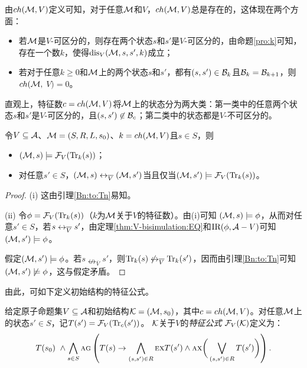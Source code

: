 由$ch({\cal M},V)$定义可知，对于任意${\cal M}$和$V$，$ch({\cal M},V)$总是存在的，这体现在两个方面：
\begin{itemize}
	\item[(1)] 若${\cal M}$是$V$-可区分的，则存在两个状态$s$和$s'$是$V$-可区分的，由命题\ref{pro:k}可知，存在一个数$k$，使得$\textrm{dis}_V({\cal M},s,s',k)$成立；
	\item[(2)] 若对于任意$k\geq 0$和${\cal M}$上的两个状态$s$和$s'$，都有$(s,s')\in {\cal B}_k$且${\cal B}_k ={\cal B}_{k+1}$，则$ch({\cal M},$ $V)=0$。
\end{itemize}

直观上，特征数$c=ch({\cal M},V)$将${\cal M}$上的状态分为两大类：第一类中的任意两个状态$s$和$s'$是$V$-可区分的，且$(s,s')\not \in {\cal B}_c$；第二类中的状态都是$V$-不可区分的。%

\begin{lemma}\label{div_s}
	令$V\subseteq {\cal A}$、${\cal M}=(S,R,L,s_0)$、$k={ch({\cal M},V)}$且$s\in S$，则
	\begin{itemize}
		\item[(i)] $({\cal M}, s)\models {\cal F}_V(\textrm{Tr}_k(s))$；
		\item[(ii)] 对任意$s'\in S$，$({\cal M},s) \leftrightarrow_{\overline V} ({\cal M},s')$当且仅当$({\cal M},s')\models{\cal F}_V(\textrm{Tr}_k(s))$。
	\end{itemize}
\end{lemma}
\begin{proof}
	(i) 这由引理\ref{Bn:to:Tn}易知。
	
	(ii) 令$\phi = {\cal F}_V(\textrm{Tr}_k(s))$（$k$为${\cal M}$关于$V$的特征数）。由(i)可知 $({\cal M}, s) \models \phi$，从而对任意$s' \in S$，若$s \leftrightarrow_{\overline V} s'$，由定理\ref{thm:V-bisimulation:EQ}和$\textrm{IR}(\phi, {\cal A} - V)$可知$({\cal M}, s') \models \phi$。
	
	假定$({\cal M}, s')\models \phi$。若$s \nleftrightarrow_{\overline V} s'$，则$\textrm{Tr}_k(s) \not \leftrightarrow_{\overline V} \textrm{Tr}_k(s')$，因而由引理\ref{Bn:to:Tn}可知$({\cal M}, s')\not \models \phi$，这与假定矛盾。
\end{proof}

由此，可如下定义初始结构的特征公式。

\begin{definition}[特征公式]
	给定原子命题集$V\subseteq\cal A$和初始结构${\cal K}=({\cal M},s_0)$，其中$c=ch({\cal M},V)$。对任意${\cal M}$上的状态$s' \in S$，记$T(s') = {\cal F}_V(\textrm{Tr}_c(s'))$。
	$\cal K$关于$V$的{\em 特征公式} ${\cal F}_V({\cal K})$定义为：
	\[T(s_0) \text{ } \wedge \bigwedge_{s\in S}\textsc{a} \textsc{g}\left(
	T(s) \rightarrow
	\bigwedge_{(s,s')\in R}
	\textsc{e} \textsc{x} T(s')
	\wedge
	\textsc{a} \textsc{x} \bigg(\bigvee_{(s,s')\in R}T(s')\bigg)
	\right).
	\]
	
\end{definition}

